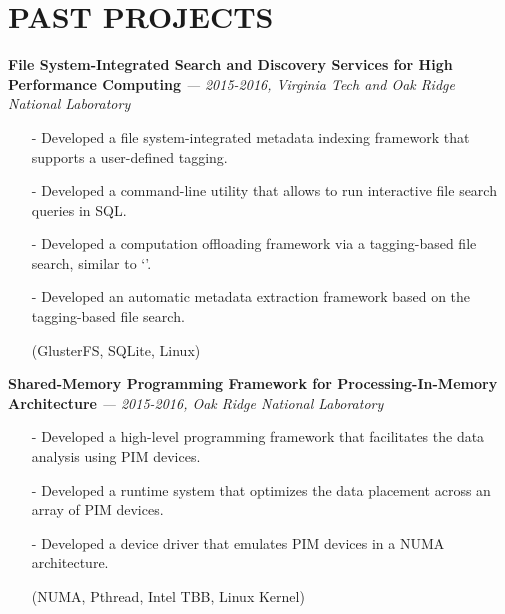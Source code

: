 \section{PAST PROJECTS} 
\vspace{0.03in}
  {\bf File System-Integrated Search and Discovery Services for High Performance Computing}
   {\it \footnotesize --- 2015-2016, Virginia Tech and Oak Ridge National Laboratory}
   \begin{itemize}[leftmargin=*]
    \setlength\itemsep{-0.02in}
    \item[-] Developed a file system-integrated metadata indexing framework
	     that supports a user-defined tagging.
    \item[-] Developed a command-line utility that allows to run interactive file search queries
             in SQL.
    \item[-] Developed a computation offloading framework via a tagging-based file search,
             similar to `'.
    \item[-] Developed an automatic metadata
	     extraction framework based on the tagging-based file search.
    \item[] {\small(GlusterFS, SQLite, Linux)}
   \end{itemize}
  \vspace{-0.15in}
  {\bf Shared-Memory Programming Framework for Processing-In-Memory Architecture}
   {\it \footnotesize --- 2015-2016, Oak Ridge National Laboratory}
   \begin{itemize}[leftmargin=*]
    \setlength\itemsep{-0.02in}
    \item[-] Developed a high-level programming framework that
             facilitates the data analysis using PIM devices.
    \item[-] Developed a runtime system that optimizes the data placement across an array of
             PIM devices.
    \item[-] Developed a device driver that emulates PIM devices in a NUMA architecture.
    \item[] {\small(NUMA, Pthread, Intel TBB, Linux Kernel)}
   \end{itemize}
